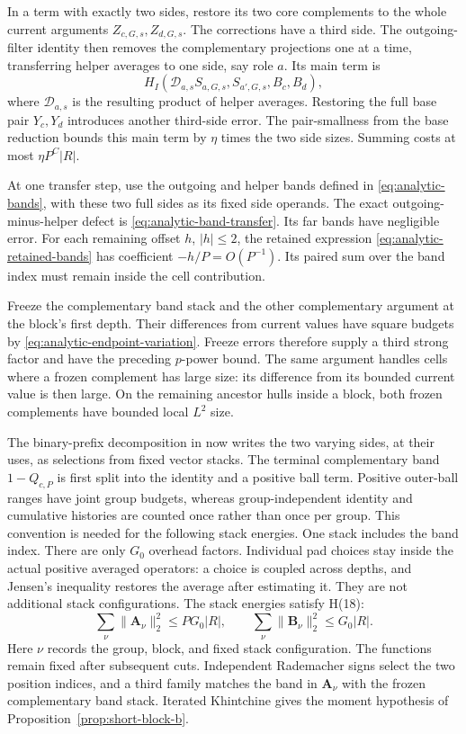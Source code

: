 In a term with exactly two sides, restore its two core complements
to the whole current arguments \(Z_{c,G,s},Z_{d,G,s}\).
The corrections have a third side.  The outgoing-filter identity
then removes the complementary projections one at a time, transferring
helper averages to one side, say role \(a\).  Its main term is
\[
 H_I(\mathcal D_{a,s}S_{a,G,s},S_{a',G,s},B_c,B_d),
\]
where \(\mathcal D_{a,s}\) is the resulting product of helper
averages.  Restoring the full base pair \(Y_c,Y_d\) introduces
another third-side error.  The pair-smallness from the base reduction
bounds this main term by \(\eta\) times the two side sizes.
Summing costs at most \(\eta P^C|R|\).

At one transfer step, use the outgoing and helper bands defined in
\eqref{eq:analytic-bands}, with these two full sides as its fixed
side operands.  The exact outgoing-minus-helper defect is
\eqref{eq:analytic-band-transfer}.  Its far bands have negligible
error.  For each remaining offset \(h\), \(|h|\le2\), the retained
expression \eqref{eq:analytic-retained-bands} has coefficient
\(-h/P=O(P^{-1})\).  Its paired sum over the band index must remain
inside the cell contribution.

Freeze the complementary band stack and the other complementary
argument at the block's first depth.  Their differences from current
values have square budgets by
\eqref{eq:analytic-endpoint-variation}.  Freeze errors therefore
supply a third strong factor and have the preceding \(p\)-power
bound.  The same argument handles cells where a frozen complement
has large size: its difference from its bounded current value is
then large.  On the remaining ancestor hulls inside a block, both
frozen complements have bounded local \(L^2\) size.

The binary-prefix decomposition in \cite[Lemma~7.4]{H} now writes
the two varying sides, at their uses, as selections from fixed vector
stacks.  The terminal complementary band \(1-Q_{c,P}\) is first
split into the identity and a positive ball term.  Positive outer-ball
ranges have joint group budgets, whereas group-independent identity
and cumulative histories are counted once rather than once per group.
This convention is needed for the following stack energies.
One stack includes the band index.  There are only \(G_0\)
overhead factors.  Individual pad choices stay inside the actual
positive averaged operators: a choice is coupled across depths,
and Jensen's inequality restores the average after estimating it.
They are not additional stack configurations.
The stack energies satisfy H(18):
\[
 \sum_\nu\|\mathbf A_\nu\|_2^2\le PG_0|R|,
 \qquad
 \sum_\nu\|\mathbf B_\nu\|_2^2\le G_0|R|.
\]
Here \(\nu\) records the group, block, and fixed stack configuration.
The functions remain fixed after subsequent cuts.  Independent
Rademacher signs select the two position indices, and a third family
matches the band in \(\mathbf A_\nu\) with the frozen complementary
band stack.  Iterated Khintchine gives the moment hypothesis of
Proposition~\ref{prop:short-block-b}.

